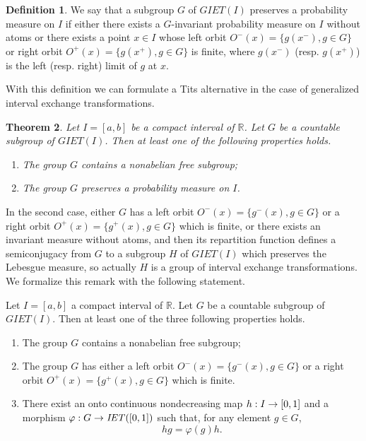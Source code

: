 \documentclass[10pt]{amsart}
\newtheorem{theo}{Theorem}[section]
\theoremstyle{definition}\newtheorem{defi}[theo]{Definition}\newtheorem{rema}[theo]{Remark}\newtheorem{exam}[theo]{Example}\newtheorem{exem}[theo]{Example}\newtheorem{nota}[theo]{Notation}
\newcommand{\R}{\mathbb{R}}
\newcounter{setofcase}
\newcounter{case}[setofcase]
\renewcommand*{\to}{\mathchoice{\longrightarrow}{\rightarrow}{\rightarrow}{\rightarrow}}
\begin{document}
\begin{defi}\label{GIETmeasure}
We say that a subgroup $G$ of $\mathit{GIET}(I)$ preserves a probability measure on $I$ if either there exists a $G$-invariant probability measure on $I$ without atoms or there exists a point $x\in I$ whose left orbit $O^-(x)=\{g(x^-),g\in G\}$ or right orbit $O^+(x)=\{g(x^+),g\in G\}$ is finite, where $g(x^-)$ (resp. $g(x^+)$) is the left (resp. right) limit of $g$ at $x$.
\end{defi}

With this definition we can formulate a Tits alternative in the case of generalized interval exchange transformations.

\begin{theo}\label{TitsIET}
Let $I=[a,b]$ be a compact interval of $\R$. Let $G$ be a countable subgroup of $\mathit{GIET}(I)$. Then at least one of the following properties holds.
\begin{enumerate}
\item\label{theo1.10.1} The group $G$ contains a nonabelian free subgroup;
\item\label{theo1.10.2} The group $G$ preserves a probability measure on $I$.
\end{enumerate}
\end{theo}

In the second case, either $G$ has a left orbit $O^-(x)=\{g^-(x),g\in G\}$ or a right orbit $O^+(x)=\{g^+(x),g\in G\}$ which is finite, or there exists an invariant measure without atoms, and then its repartition function defines a semiconjugacy from $G$ to a subgroup $H$ of $\mathit{GIET}(I)$ which preserves the Lebesgue measure, so actually $H$ is a group of interval exchange transformations. We formalize this remark with the following statement.



\begin{coro}
Let $I=[a,b]$ a compact interval of $\R$. Let $G$ be a countable subgroup of $\mathit{GIET}(I)$. Then at least one of the three following properties holds.
\begin{enumerate}
\item\label{coro1.11.1} The group $G$ contains a nonabelian free subgroup;
\item\label{coro1.11.2} The group $G$ has either a left orbit $O^-(x)=\{g^-(x),g\in G\}$ or a right orbit $O^+(x)=\{g^+(x),g\in G\}$ which is finite.
\item\label{coro1.11.3} There exist an onto continuous nondecreasing map $h : I \to [0,1]$ and a morphism $\varphi : G \to \mathit{IET}([0,1])$ such that, for any element $g \in G$,
\[
hg=\varphi(g)h.
\]
\end{enumerate}
\end{coro}
\end{document}
